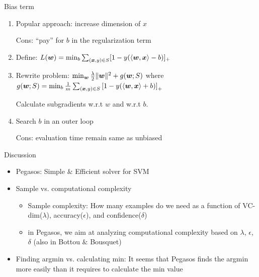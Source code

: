 \begin{frame}{Bias term}
    \begin{enumerate}
        \item Popular approach: increase dimension of $x$

            {\color{green}Cons: ``pay'' for $b$ in the regularization term}
        \item Define: $L(\bm{w}) = \min_b \sum_{(\bm{x},y)\in S} [1-y(\langle \bm{w}, \bm{x}\rangle - b)]_+$
        \item Rewrite problem: $\min_{\bm{w}} {\frac{\lambda}{2}\|\bm{w}\|^2+g(\bm{w};S)}$ where $g(\bm{w};S)=\min_b \frac1m \sum_{(\bm{x},y)\in S} \left[1-y(\langle \bm{w}, \bm{x}\rangle + b)\right]_+$

        Calculate subgradients w.r.t $w$ and w.r.t $b$.

        \item Search $b$ in an outer loop

            {\color{green}Cons: evaluation time remain same as unbiased}
    \end{enumerate}
\end{frame}

\begin{frame}{Discussion}
    \begin{itemize}
        \item Pegasos: Simple $\&$ Efficient solver for SVM
        \item Sample vs. computational complexity
            \begin{itemize}
                \item Sample complexity: How many examples do we need as a function of VC-dim($\lambda$), accuracy($\epsilon$), and confidence($\delta$)
                \item in Pegasos, we aim at analyzing computational complexity based on $\lambda$, $\epsilon$, $\delta$ (also in Bottou $\&$ Bousquet)
            \end{itemize}
        \item Finding argmin vs. calculating min: It seems that Pegasos finds the argmin more easily than it requires to calculate the min value
    \end{itemize}
\end{frame}
